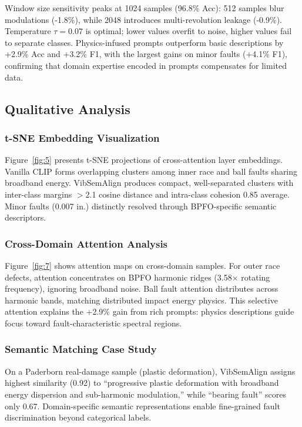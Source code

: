 Window size sensitivity peaks at 1024 samples (96.8\% Acc): 512 samples blur modulations (-1.8\%), while 2048 introduces multi-revolution leakage (-0.9\%). Temperature $\tau=0.07$ is optimal; lower values overfit to noise, higher values fail to separate classes. Physics-infused prompts outperform basic descriptions by +2.9\% Acc and +3.2\% F1, with the largest gains on minor faults (+4.1\% F1), confirming that domain expertise encoded in prompts compensates for limited data.

\subsection{Qualitative Analysis}

\subsubsection{t-SNE Embedding Visualization}
Figure~\ref{fig:5} presents t-SNE projections of cross-attention layer embeddings. Vanilla CLIP forms overlapping clusters among inner race and ball faults sharing broadband energy. VibSemAlign produces compact, well-separated clusters with inter-class margins $>$2.1 cosine distance and intra-class cohesion 0.85 average. Minor faults (0.007 in.) distinctly resolved through BPFO-specific semantic descriptors.

\subsubsection{Cross-Domain Attention Analysis}
Figure~\ref{fig:7} shows attention maps on cross-domain samples. For outer race defects, attention concentrates on BPFO harmonic ridges (3.58$\times$ rotating frequency), ignoring broadband noise. Ball fault attention distributes across harmonic bands, matching distributed impact energy physics. This selective attention explains the +2.9\% gain from rich prompts: physics descriptions guide focus toward fault-characteristic spectral regions.

\subsubsection{Semantic Matching Case Study}
On a Paderborn real-damage sample (plastic deformation), VibSemAlign assigns highest similarity (0.92) to ``progressive plastic deformation with broadband energy dispersion and sub-harmonic modulation,'' while ``bearing fault'' scores only 0.67. Domain-specific semantic representations enable fine-grained fault discrimination beyond categorical labels.

